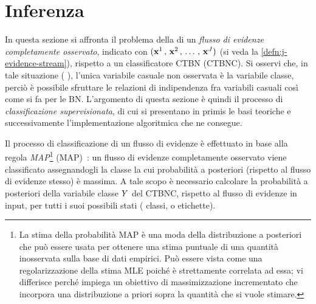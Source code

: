 \cleardoublepage
\section{Inferenza}\label{sec:inference-ctbnc}
In questa sezione si affronta il problema della \emph{} di un \emph{flusso di evidenze completamente osservato}, indicato con $(\mathbf{x}^1\,,\,\mathbf{x}^2\,,\,\dotsc\,,\,\mathbf{x}^{J})$ (si veda la \autoref{defn:j-evidence-stream}), rispetto a un classificatore \acs{CTBN} (\acs{CTBNC}). Si osservi che, in tale situazione (\ie{} \emph{}), l'unica variabile casuale non osservata è la variabile classe, perciò è possibile sfruttare le relazioni di indipendenza fra variabili casuali così come si fa per le \acl{BN}. L'argomento di questa sezione è quindi il processo di \emph{classificazione supervisionata}, di cui si presentano in primis le basi teoriche e successivamente l'implementazione algoritmica che ne consegue.

Il processo di classificazione di un flusso di evidenze è effettuato in base alla regola \emph{\acl{MAP}}\footnote{La stima della probabilità \acf{MAP} è una moda della distribuzione a posteriori che può essere usata per ottenere una stima puntuale di una quantità inosservata sulla base di dati empirici. Può essere vista come una regolarizzazione della stima \acf{MLE} poiché è strettamente correlata ad essa; vi differisce perché impiega un obiettivo di massimizzazione incrementato che incorpora una distribuzione a priori sopra la quantità che si vuole stimare.} (\acs{MAP})~\citep[si veda][]{Stella2012}: un flusso di evidenze completamente osservato viene classificato assegnandogli la classe la cui probabilità a posteriori (rispetto al flusso di evidenze stesso) è massima. A tale scopo è necessario calcolare la probabilità a posteriori della variabile classe $\mathnormal{Y}$ del \acs{CTBNC}, rispetto al flusso di evidenze in input, per tutti i suoi possibili stati (\ie{} classi, o etichette).

